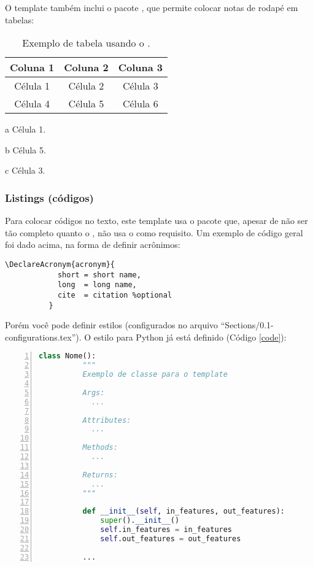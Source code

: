         O template também inclui o pacote , que permite colocar notas de rodapé em tabelas:
        \begin{table}[h!]
          \centering
          \caption{Exemplo de tabela usando o .}
          \label{tab:ex_5}
          \begin{threeparttable}
            \begin{tabular}{ccc}
              \toprule
              \textbf{Coluna 1} & \textbf{Coluna 2} & \textbf{Coluna 3} \\ \midrule
              Célula 1\tnote{a} & Célula 2          & Célula 3\tnote{c} \\ 
              Célula 4          & Célula 5\tnote{b} & Célula 6          \\ 
              \bottomrule
            \end{tabular}
            \begin{tablenotes}
              \item[a] Célula 1.
              \item[b] Célula 5.
              \item[c] Célula 3.
            \end{tablenotes}
          \end{threeparttable}
        \end{table}

      \subsubsection{Listings (códigos)}
        Para colocar códigos no texto, este template usa o pacote  que, apesar de não ser tão completo quanto o , não usa o  como requisito. Um exemplo de código geral foi dado acima, na forma de definir acrônimos:
        \begin{lstlisting}[autogobble]
          \DeclareAcronym{acronym}{
            short = short name,
            long  = long name,
            cite  = citation %optional
          }
        \end{lstlisting}

        Porém você pode definir estilos (configurados no arquivo ``Sections/0.1-configurations.tex''). O estilo para Python já está definido (Código \ref{code}):
        \begin{lstlisting}[label=code, language=Python, numbers=left, autogobble]
          class Nome():
          """
          Exemplo de classe para o template
      
          Args:
            ...
      
          Attributes:
            ...
      
          Methods:
            ...
      
          Returns:
            ...
          """
      
          def __init__(self, in_features, out_features):
              super().__init__()
              self.in_features = in_features
              self.out_features = out_features

          ...
        \end{lstlisting}

